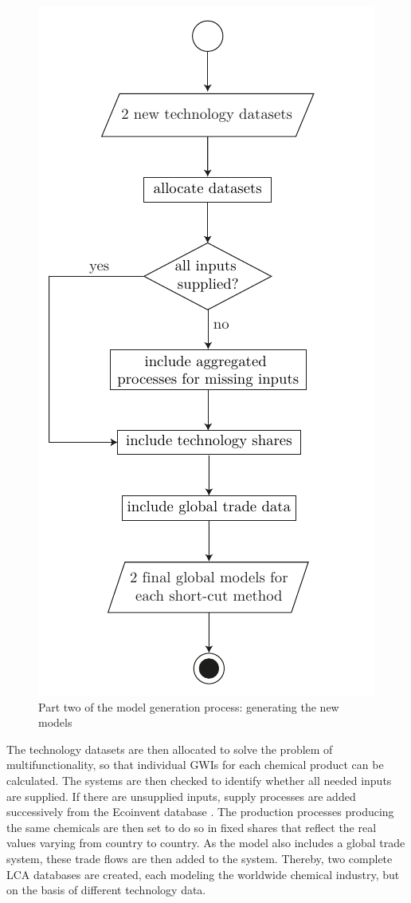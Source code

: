 \begin{figure}[htp]
        \centering
        \includegraphics{images/plan_2.pdf}
        \caption{Part two of the model generation process: generating the new models}
        \label{fig:plan_2}
\end{figure}

The technology datasets are then allocated to solve the problem of multifunctionality, so that individual \aclp{GWI} for each chemical product can be calculated. The systems are then checked to identify whether all needed inputs are supplied. If there are unsupplied inputs, supply processes are added successively from the Ecoinvent database \cite{Ecoinvent.2020}. The production processes producing the same chemicals are then set to do so in fixed shares that reflect the real values varying from country to country. As the model also includes a global trade system, these trade flows are then added to the system. Thereby, two complete LCA databases are created, each modeling the worldwide chemical industry, but on the basis of different technology data.
\vspace{2cm}


